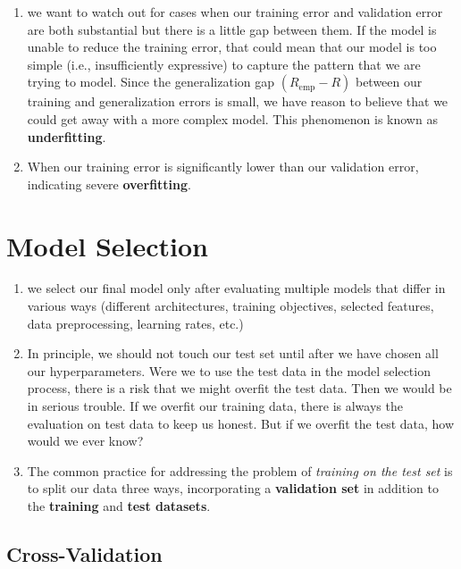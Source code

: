 \begin{enumerate}[itemsep=0.2cm]
    \item we want to watch out for cases when our training error and validation error are both substantial but there is a little gap between them. If the model is unable to reduce the training error, that could mean that our model is too simple (i.e., insufficiently expressive) to capture the pattern that we are trying to model. Since the generalization gap $(R_\textrm{emp} - R)$ between our training and generalization errors is small, we have reason to believe that we could get away with a more complex model. This phenomenon is known as \textbf{underfitting}.

    \item When our training error is significantly lower than our validation error, indicating severe \textbf{overfitting}.

    
\end{enumerate}



\section{Model Selection \cite{dnn-1}}\label{Model Selection}

\begin{enumerate}[itemsep=0.2cm]
    \item we select our final model only after evaluating multiple models that differ in various ways (different architectures, training objectives, selected features, data preprocessing, learning rates, etc.)

    \item In principle, we should not touch our test set until after we have chosen all our hyperparameters. Were we to use the test data in the model selection process, there is a risk that we might overfit the test data. Then we would be in serious trouble. If we overfit our training data, there is always the evaluation on test data to keep us honest. But if we overfit the test data, how would we ever know?

    \item The common practice for addressing the problem of \textit{training on the test set} is to split our data three ways, incorporating a \textbf{validation set} in addition to the \textbf{training} and \textbf{test datasets}.    
\end{enumerate}


\subsection{Cross-Validation \cite{dnn-1,geeksforgeeks/cross-validation-machine-learning/}}\label{Cross-Validation}

